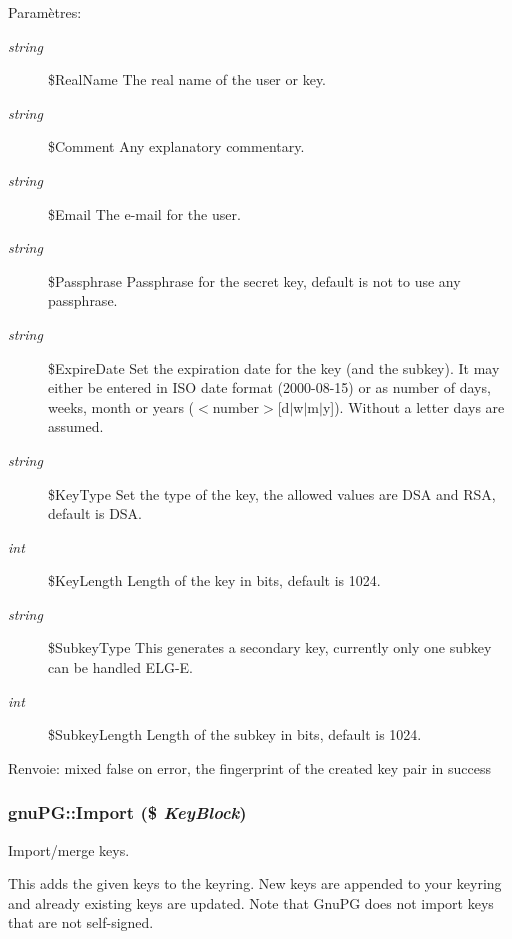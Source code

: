 \begin{Desc}
\item[Param\`{e}tres:]
\begin{description}
\item[{\em string}]\$Real\-Name The real name of the user or key. \item[{\em string}]\$Comment Any explanatory commentary. \item[{\em string}]\$Email The e-mail for the user. \item[{\em string}]\$Passphrase Passphrase for the secret key, default is not to use any passphrase. \item[{\em string}]\$Expire\-Date Set the expiration date for the key (and the subkey). It may either be entered in ISO date format (2000-08-15) or as number of days, weeks, month or years ($<$number$>$\mbox{[}d$|$w$|$m$|$y\mbox{]}). Without a letter days are assumed. \item[{\em string}]\$Key\-Type Set the type of the key, the allowed values are DSA and RSA, default is DSA. \item[{\em int}]\$Key\-Length Length of the key in bits, default is 1024. \item[{\em string}]\$Subkey\-Type This generates a secondary key, currently only one subkey can be handled ELG-E. \item[{\em int}]\$Subkey\-Length Length of the subkey in bits, default is 1024. \end{description}
\end{Desc}
\begin{Desc}
\item[Renvoie:]mixed false on error, the fingerprint of the created key pair in success\end{Desc}
\hypertarget{classgnuPG_a4}{
\subsubsection[Import]{\setlength{\rightskip}{0pt plus 5cm}gnu\-PG::Import (\$ {\em Key\-Block})}}
\label{classgnuPG_a4}


Import/merge keys.

This adds the given keys to the keyring. New keys are appended to your keyring and already existing keys are updated. Note that Gnu\-PG does not import keys that are not self-signed.

